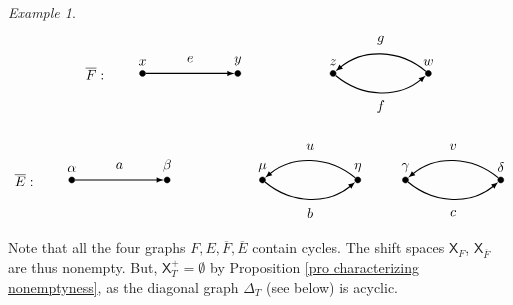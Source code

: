 \documentclass[a4paper,reqno,12pt]{amsart}
\theoremstyle{definition}
\theoremstyle{remark}
\newtheorem{example}[thm]{Example}
\begin{document}
\begin{example}
\[
\begin{tikzpicture}[scale=1.2]
\node[inner sep=1.5pt, circle,draw,fill=black,label={$x$}] (A) at (0,0) {};	
\node[inner sep=1.5pt, circle,draw,fill=black,label={$y$}] (B) at (2,0) {};
\node[inner sep=1.5pt, circle,draw,fill=black,label={$z$}] (C) at (4,0) {};	
\node[inner sep=1.5pt, circle,draw,fill=black,label={$w$}] (D) at (6,0) {};

\path[->,black, >=latex,thick] (A) edge [left] node[above=0.05cm]{} (B);
\path[->, >=latex,thick] (C) edge [bend right=40] node[below=0.05cm]{} (D);
\path[->, >=latex,thick] (D) edge [bend right=40] node[below=0.05cm]{} (C);

\node at (1,0.3) {$e$};
\node at (5,0.7) {$g$};
\node at (5,-0.7) {$f$};

\node at (-1,0) {$\overline{F}:$};

\end{tikzpicture}
\]

\[
\begin{tikzpicture}[scale=1.2]
\node[inner sep=1.5pt, circle,draw,fill=black,label={$\alpha$}] (A) at (0,0) {};	
\node[inner sep=1.5pt, circle,draw,fill=black,label={$\beta$}] (B) at (2,0) {};
\node[inner sep=1.5pt, circle,draw,fill=black,label={$\mu$}] (C) at (4,0) {};	
\node[inner sep=1.5pt, circle,draw,fill=black,label={$\eta$}] (D) at (6,0) {};
\node[inner sep=1.5pt, circle,draw,fill=black,label={$\gamma$}] (E) at (7,0) {};	
\node[inner sep=1.5pt, circle,draw,fill=black,label={$\delta$}] (F) at (9,0) {};

\path[->,black, >=latex,thick] (A) edge [left] node[above=0.05cm]{} (B);
\path[->, >=latex,thick] (C) edge [bend right=40] node[below=0.05cm]{} (D);
\path[->, >=latex,thick] (D) edge [bend right=40] node[below=0.05cm]{} (C);
\path[->, >=latex,thick] (E) edge [bend right=40] node[below=0.05cm]{} (F);
\path[->, >=latex,thick] (F) edge [bend right=40] node[below=0.05cm]{} (E);

\node at (1,0.3) {$a$};
\node at (5,0.7) {$u$};
\node at (5,-0.7) {$b$};
\node at (8,0.7) {$v$};
\node at (8,-0.7) {$c$};

\node at (-1,0) {$\overline{E}:$};

\end{tikzpicture}
\]
Note that all the four graphs $F,E,\overline{F}, \overline{E}$ contain cycles. The shift spaces $\mathsf{X}_F$, $\mathsf{X}_{\overline{F}}$ are thus nonempty. But, $\mathsf{X}_T^+=\emptyset$ by Proposition \ref{pro characterizing nonemptyness}, as the diagonal graph $\Delta_T$ (see below) is acyclic. 


\end{example}
\end{document}
